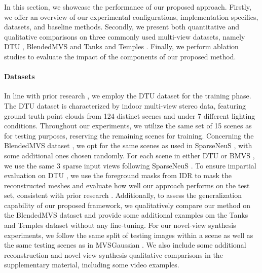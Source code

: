 In this section, we showcase the performance of our proposed approach. Firstly, we offer an overview of our experimental configurations, implementation specifics, datasets, and baseline methods. Secondly, we present both quantitative and qualitative comparisons on three commonly used multi-view datasets, namely DTU \cite{aanaes2016large}, BlendedMVS \cite{yao2020blendedmvs} and Tanks and Temples \cite{knapitsch2017tanks}. Finally, we perform ablation studies to evaluate the impact of the components of our proposed method.
\vspace{-15pt}
\paragraph{Datasets}
In line with prior research \cite{long2022sparseneus, ren2023volrecon, liang2024retr, na2024uforecon}, we employ the DTU dataset \cite{aanaes2016large} for the training phase. The DTU dataset \cite{aanaes2016large} is characterized by indoor multi-view stereo data, featuring ground truth point clouds from 124 distinct scenes and under 7 different lighting conditions. Throughout our experiments, we utilize the same set of 15 scenes as \cite{long2022sparseneus, ren2023volrecon, liang2024retr, jena2024geotransfer, na2024uforecon} for testing purposes, reserving the remaining scenes for training. Concerning the BlendedMVS dataset \cite{yao2020blendedmvs}, we opt for the same scenes as used in SparseNeuS \cite{long2022sparseneus}, with some additional ones chosen randomly. For each scene in either DTU \cite{aanaes2016large} or BMVS \cite{yao2020blendedmvs}, we use the same $3$ sparse input views following SparseNeuS \cite{long2022sparseneus}. To ensure impartial evaluation on DTU \cite{aanaes2016large}, we use the foreground masks from IDR \cite{yariv2020multiview} to mask the reconstructed meshes and evaluate how well our approach performs on the test set, consistent with prior research \cite{long2022sparseneus, ren2023volrecon, liang2024retr, jena2024geotransfer, na2024uforecon}. Additionally, to assess the generalization capability of our proposed framework, we qualitatively compare our method on the BlendedMVS dataset \cite{yao2020blendedmvs} and provide some additional examples om the Tanks and Temples dataset \cite{knapitsch2017tanks} without any fine-tuning. For our novel-view synthesis experiments, we follow the same split of testing images within a scene as well as the same testing scenes as in MVSGaussian \cite{liu2024fast}. We also include some additional reconstruction and novel view synthesis qualitative comparisons in the supplementary material, including some video examples.

